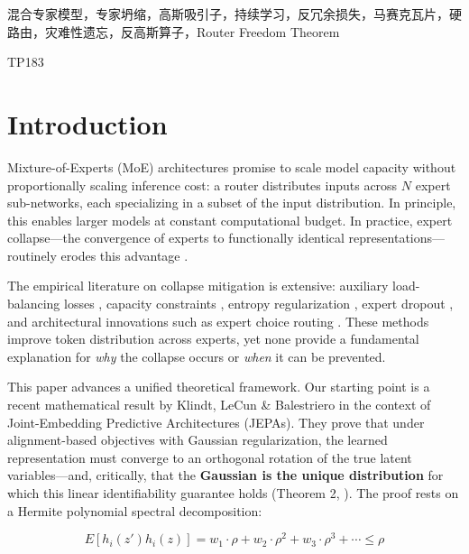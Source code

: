 \documentclass[twoside]{article}
\theoremstyle{definition}
\begin{document}
{ 混合专家模型，专家坍缩，高斯吸引子，持续学习，反冗余损失，马赛克瓦片，硬路由，灾难性遗忘，反高斯算子，Router Freedom Theorem}

{ TP183}

\vspace{12pt}

\newpage\newpage


\section{Introduction}

Mixture-of-Experts (MoE) architectures \cite{shazeer2017,fedus2022} promise to scale model capacity without proportionally scaling inference cost: a router distributes inputs across $N$ expert sub-networks, each specializing in a subset of the input distribution. In principle, this enables larger models at constant computational budget. In practice, expert collapse---the convergence of experts to functionally identical representations---routinely erodes this advantage \cite{zoph2022,chi2022,dai2024}.

The empirical literature on collapse mitigation is extensive: auxiliary load-balancing losses \cite{lepikhin2021,du2022}, capacity constraints \cite{riquelme2021}, entropy regularization \cite{bengio2016}, expert dropout \cite{chen2022}, and architectural innovations such as expert choice routing \cite{zhou2022}. These methods improve token distribution across experts, yet none provide a fundamental explanation for \emph{why} the collapse occurs or \emph{when} it can be prevented.

This paper advances a unified theoretical framework. Our starting point is a recent mathematical result by Klindt, LeCun \& Balestriero \cite{klindt2026} in the context of Joint-Embedding Predictive Architectures (JEPAs). They prove that under alignment-based objectives with Gaussian regularization, the learned representation must converge to an orthogonal rotation of the true latent variables---and, critically, that the \textbf{Gaussian is the unique distribution} for which this linear identifiability guarantee holds (Theorem 2, \cite{klindt2026}). The proof rests on a Hermite polynomial spectral decomposition:

$$E[h_i(z') h_i(z)] = w_1 \cdot \rho + w_2 \cdot \rho^2 + w_3 \cdot \rho^3 + \cdots \leq \rho$$
\end{document}
